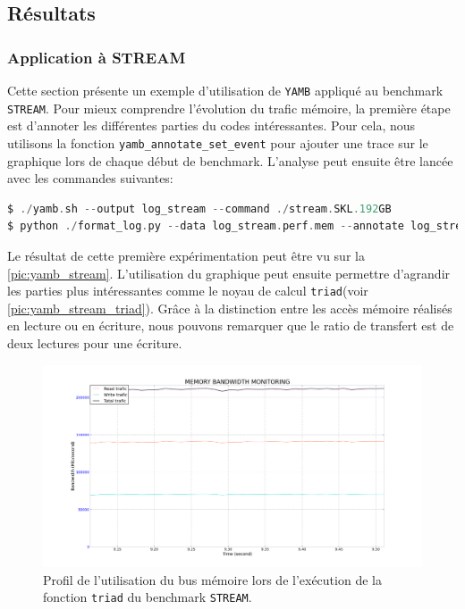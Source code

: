 \subsection{Résultats}


    \subsubsection{Application à STREAM}

        Cette section présente un exemple d'utilisation de \verb=YAMB= appliqué au benchmark \verb=STREAM=. Pour mieux comprendre l'évolution du trafic mémoire, la première étape est d'annoter les différentes parties du codes intéressantes. Pour cela, nous utilisons la fonction \verb=yamb_annotate_set_event= pour ajouter une trace sur le graphique lors de chaque début de benchmark. L'analyse peut ensuite être lancée avec les commandes suivantes:
    
\begin{lstlisting}[label=lst:yamb_api ,language=C]
$ ./yamb.sh --output log_stream --command ./stream.SKL.192GB
$ python ./format_log.py --data log_stream.perf.mem --annotate log_stream.annotate
\end{lstlisting}

        Le résultat de cette première expérimentation peut être vu sur la \autoref{pic:yamb_stream}. L'utilisation du graphique peut ensuite permettre d'agrandir les parties plus intéressantes comme le noyau de calcul \verb=triad=(voir \autoref{pic:yamb_stream_triad}). Grâce à la distinction entre les accès mémoire réalisés en lecture ou en écriture, nous pouvons remarquer que le ratio de transfert est de deux lectures pour une écriture.
        
        
        \begin{figure}
        \center
        \includegraphics[width=14cm]{images/yamb_stream_triad.png}
        \caption{\label{pic:yamb_stream_triad} Profil de l'utilisation du bus mémoire lors de l'exécution de la fonction \texttt{triad} du benchmark \texttt{STREAM}.}
        \end{figure}


